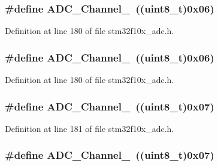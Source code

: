 \subsubsection[{\texorpdfstring{A\+D\+C\+\_\+\+Channel\+\_\+6}{ADC_Channel_6}}]{\setlength{\rightskip}{0pt plus 5cm}\#define A\+D\+C\+\_\+\+Channel\+\_~(({\bf uint8\+\_\+t})0x06)}\hypertarget{group___a_d_c__channels_ga7e24a73eec4aeb7d8e2f9008825ceacb}{}\label{group___a_d_c__channels_ga7e24a73eec4aeb7d8e2f9008825ceacb}


Definition at line 180 of file stm32f10x\+\_\+adc.\+h.

\subsubsection[{\texorpdfstring{A\+D\+C\+\_\+\+Channel\+\_\+6}{ADC_Channel_6}}]{\setlength{\rightskip}{0pt plus 5cm}\#define A\+D\+C\+\_\+\+Channel\+\_~(({\bf uint8\+\_\+t})0x06)}\hypertarget{group___a_d_c__channels_ga7e24a73eec4aeb7d8e2f9008825ceacb}{}\label{group___a_d_c__channels_ga7e24a73eec4aeb7d8e2f9008825ceacb}


Definition at line 180 of file stm32f10x\+\_\+adc.\+h.

\subsubsection[{\texorpdfstring{A\+D\+C\+\_\+\+Channel\+\_\+7}{ADC_Channel_7}}]{\setlength{\rightskip}{0pt plus 5cm}\#define A\+D\+C\+\_\+\+Channel\+\_~(({\bf uint8\+\_\+t})0x07)}\hypertarget{group___a_d_c__channels_ga9723aa5fe6b9f4af1ffd3b90e6eef8d1}{}\label{group___a_d_c__channels_ga9723aa5fe6b9f4af1ffd3b90e6eef8d1}


Definition at line 181 of file stm32f10x\+\_\+adc.\+h.

\subsubsection[{\texorpdfstring{A\+D\+C\+\_\+\+Channel\+\_\+7}{ADC_Channel_7}}]{\setlength{\rightskip}{0pt plus 5cm}\#define A\+D\+C\+\_\+\+Channel\+\_~(({\bf uint8\+\_\+t})0x07)}\hypertarget{group___a_d_c__channels_ga9723aa5fe6b9f4af1ffd3b90e6eef8d1}{}\label{group___a_d_c__channels_ga9723aa5fe6b9f4af1ffd3b90e6eef8d1}


